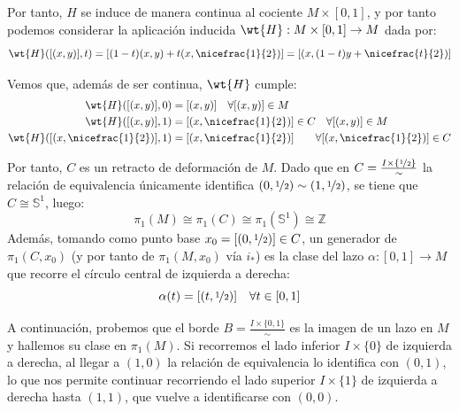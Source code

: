 \documentclass[12pt]{article}
\begin{document}
\begin{ejercicio}
        Por tanto, $H$ se induce de manera continua al cociente $M\times [0,1]$, y por tanto podemos considerar la aplicación inducida $\wt{H}:M\times [0,1]\to M$ dada por:
        \begin{equation*}
            \wt{H}([(x,y)],t) = [(1-t)(x,y) + t(x,\nicefrac{1}{2})] = [(x, (1-t)y + \nicefrac{t}{2})]
        \end{equation*}

        Vemos que, además de ser continua, $\wt{H}$ cumple:
        \begin{align*}
            \wt{H}([(x,y)],0) &= [(x,y)] \quad \forall [(x,y)]\in M\\
            \wt{H}([(x,y)],1) &= [(x,\nicefrac{1}{2})]\in C\quad \forall [(x,y)]\in M\\
            \wt{H}([(x,\nicefrac{1}{2})],1) &= [(x,\nicefrac{1}{2})]\qquad \forall [(x,\nicefrac{1}{2})]\in C
        \end{align*}
        
        Por tanto, $C$ es un retracto de deformación de $M$. %
        Dado que en $C = \frac{I\times\{\nicefrac{1}{2}\}}{\sim}$ la relación de equivalencia únicamente identifica $(0,\nicefrac{1}{2}) \sim (1,\nicefrac{1}{2})$, se tiene que $C \cong \mathbb{S}^1$, luego:
        \begin{equation*}
            \pi_1(M) \cong \pi_1(C) \cong \pi_1(\mathbb{S}^1) \cong \mathbb{Z}
        \end{equation*}
        Además, tomando como punto base $x_0 = [(0,\nicefrac{1}{2})] \in C$, un generador de $\pi_1(C, x_0)$ (y por tanto de $\pi_1(M, x_0)$ vía $i_*$) es la clase del lazo $\alpha:[0,1]\to M$ que recorre el círculo central de izquierda a derecha:
        \begin{equation*}
            \alpha(t) = [(t, \nicefrac{1}{2})] \quad \forall t\in [0,1]
        \end{equation*}

        \medskip
        \noindent
        A continuación, probemos que el borde $B = \frac{I\times\{0,1\}}{\sim}$ es la imagen de un lazo en $M$ y hallemos su clase en $\pi_1(M)$. Si recorremos el lado inferior $I\times \{0\}$ de izquierda a derecha, al llegar a $(1,0)$ la relación de equivalencia lo identifica con $(0,1)$, lo que nos permite continuar recorriendo el lado superior $I\times \{1\}$ de izquierda a derecha hasta $(1,1)$, que vuelve a identificarse con $(0,0)$.


\end{ejercicio}
\end{document}
